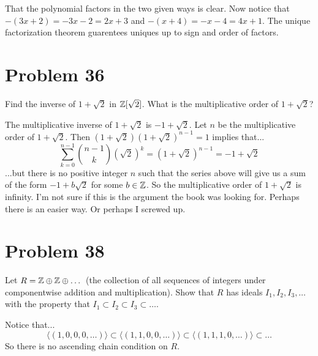\documentclass{article}
\begin{document}
That the polynomial factors in the two given ways is clear.
Now notice that $-(3x+2)=-3x-2=2x+3$ and $-(x+4)=-x-4=4x+1$.
The unique factorization theorem guarentees uniques up to sign and
order of factors.

\section*{Problem 36}

Find the inverse of $1+\sqrt{2}$ in $\mathbb{Z}[\sqrt{2}]$.  What is the multiplicative
order of $1+\sqrt{2}$?

The multiplicative inverse of $1+\sqrt{2}$ is $-1+\sqrt{2}$.
Let $n$ be the multiplicative order of $1+\sqrt{2}$.
Then $(1+\sqrt{2})(1+\sqrt{2})^{n-1}=1$ implies that...
\begin{equation*}
\sum_{k=0}^{n-1}\binom{n-1}{k}(\sqrt{2})^k=(1+\sqrt{2})^{n-1}=-1+\sqrt{2}
\end{equation*}
...but there is no positive integer $n$ such that the series above
will give us a sum of the form $-1+b\sqrt{2}$ for some $b\in\mathbb{Z}$.
So the multiplicative order of $1+\sqrt{2}$ is infinity.
I'm not sure if this is the argument the book was looking for.  Perhaps
there is an easier way.  Or perhaps I screwed up.

\section*{Problem 38}

Let $R=\mathbb{Z}\oplus\mathbb{Z}\oplus\dots$ (the collection of all sequences of integers under
componentwise addition and multiplication).  Show that $R$ has ideals $I_1,I_2,I_3,\dots$
with the property that $I_1\subset I_2\subset I_3\subset\dots$.

Notice that...
\begin{equation*}
\langle (1,0,0,0,\dots)\rangle\subset
\langle (1,1,0,0,\dots)\rangle\subset
\langle (1,1,1,0,\dots)\rangle\subset\dots
\end{equation*}
So there is no ascending chain condition on $R$.
\end{document}
